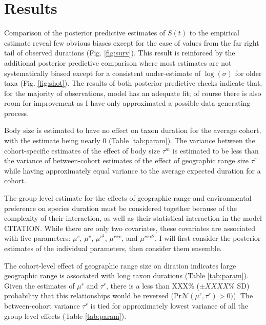 \documentclass{article}
\begin{document}




\section{Results}

Comparison of the posterior predictive estimates of \(S(t)\) to the empirical estimate reveal few obvious biases except for the case of values from the far right tail of observed durations (Fig. \ref{fig:surv}). This result is reinforced by the additional posterior predictive comparison where most estimates are not systematically biased except for a consistent under-estimate of \(\log(\sigma)\) for older taxa (Fig. \ref{fig:shot}). The results of both posterior predictive checks indicate that, for the majority of observations, model has an adequate fit; of course there is also room for improvement as I have only approximated a possible data generating process.

Body size is estimated to have no effect on taxon duration for the average cohort, with the estimate being nearly 0 (Table \ref{tab:param}). The variance between the cohort-specific estimates of the effect of body size \(\tau^{m}\) is estimated to be less than the variance of between-cohort estimates of the effect of geographic range size \(\tau^{r}\) while having approximately equal variance to the average expected duration for a cohort. 


The group-level estimate for the effects of geographic range and environmental preference on species duration must be considered together because of the complexity of their interaction, as well as their statistical interaction in the model CITATION. While there are only two covariates, these covariates are associated with five parameters: \(\mu^{r}\), \(\mu^{v}\), \(\mu^{v^{2}}\), \(\mu^{rxv}\), and \(\mu^{rxv2}\). I will first consider the posterior estimates of the individual parameters, then consider them ensemble.

The cohort-level effect of geographic range size on diration indicates large geographic range is associated with long taxon durations (Table \ref{tab:param}). Given the estimates of \(\mu^{r}\) and \(\tau^{r}\), there is a less than XXX\% (\(\pm XXXX\%\) SD) probability that this relationships would be reversed (\(\mathrm{Pr}\mathcal{N}(\mu^{r}, \tau^{r}) > 0)\)). The between-cohort variance \(\tau^{r}\) is tied for approximately lowest variance of all the group-level effects (Table \ref{tab:param}).
\end{document}
